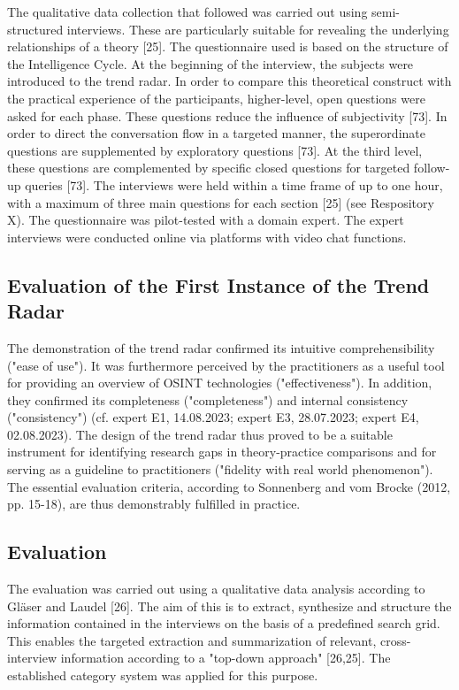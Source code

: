 \documentclass[10pt]{article}
\begin{document}
The qualitative data collection that followed was carried out using
semi-structured interviews. These are particularly suitable for
revealing the underlying relationships of a theory [25]. The
questionnaire used is based on the structure of the Intelligence Cycle.
At the beginning of the interview, the subjects were introduced to the
trend radar. In order to compare this theoretical construct with the
practical experience of the participants, higher-level, open questions
were asked for each phase. These questions reduce the influence of
subjectivity [73]. In order to direct the conversation flow in a
targeted manner, the superordinate questions are supplemented by
exploratory questions [73]. At the third level, these questions are
complemented by specific closed questions for targeted follow-up
queries [73]. The interviews were held within a time frame of up to
one hour, with a maximum of three main questions for each section 
[25] (see Respository X). The questionnaire was pilot-tested with a
domain expert. The expert interviews were conducted online via
platforms with video chat functions.

\subsection{Evaluation of the First Instance of the Trend Radar}

The demonstration of the trend radar confirmed its intuitive
comprehensibility ("ease of use"). It was furthermore perceived by the
practitioners as a useful tool for providing an overview of OSINT
technologies ("effectiveness"). In addition, they confirmed its
completeness ("completeness") and internal consistency ("consistency")
(cf. expert E1, 14.08.2023; expert E3, 28.07.2023; expert E4,
02.08.2023). The design of the trend radar thus proved to be a
suitable instrument for identifying research gaps in theory-practice
comparisons and for serving as a guideline to practitioners
("fidelity with real world phenomenon"). The essential evaluation
criteria, according to Sonnenberg and vom Brocke (2012, pp. 15-18),
are thus demonstrably fulfilled in practice.

\subsection{Evaluation}

The evaluation was carried out using a qualitative data analysis
according to Gläser and Laudel [26]. The aim of this is to extract,
synthesize and structure the information contained in the interviews
on the basis of a predefined search grid. This enables the targeted
extraction and summarization of relevant, cross-interview information
according to a "top-down approach" [26,25]. The established category
system was applied for this purpose.
\end{document}
